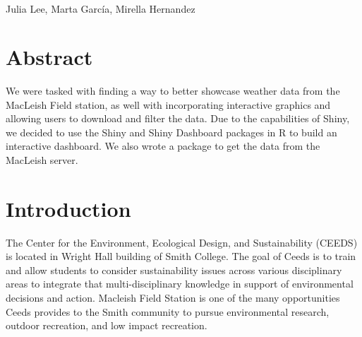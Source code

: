 \documentclass[10pt,letterpaper]{article}
\begin{document}
\vspace*{0.2in}

\begin{flushleft}
{\Large
\textbf{} %
}
\newline
\\
Julia Lee\textsuperscript{},
Marta García\textsuperscript{},
Mirella Hernandez\textsuperscript{}\\
\bigskip
\bigskip
\end{flushleft}
\section*{Abstract}
We were tasked with finding a way to better showcase weather data from
the MacLeish Field station, as well with incorporating interactive
graphics and allowing users to download and filter the data. Due to the
capabilities of Shiny, we decided to use the Shiny and Shiny Dashboard
packages in R to build an interactive dashboard. We also wrote a package
to get the data from the MacLeish server.


\linenumbers

\section{Introduction}\label{introduction}

The Center for the Environment, Ecological Design, and Sustainability
(CEEDS) is located in Wright Hall building of Smith College. The goal of
Ceeds is to train and allow students to consider sustainability issues
across various disciplinary areas to integrate that multi-disciplinary
knowledge in support of environmental decisions and action. Macleish
Field Station is one of the many opportunities Ceeds provides to the
Smith community to pursue environmental research, outdoor recreation,
and low impact recreation.
\end{document}
